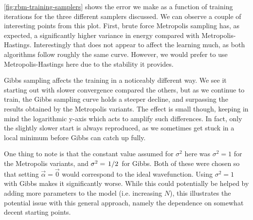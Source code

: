 \documentclass[a4paper, 11pt]{article}
\begin{document}
\begin{multicols}{2}
    
    
    \autoref{fig:rbm-training-samplers} shows the error we make as a function of
    training iterations for the three different samplers discussed. We can
    observe a couple of interesting points from this plot. First, brute force
    Metropolis sampling has, as expected, a significantly higher variance in
    energy compared with Metropolis-Hastings. Interestingly that does not appear
    to affect the learning much, as both algorithms follow roughly the same
    curve. However, we would prefer to use Metropolis-Hastings here due to the
    stability it provides. 

    Gibbs sampling affects the training in a noticeably different way. We see it
    starting out with slower convergence compared the others, but as we continue
    to train, the Gibbs sampling curve holds a steeper decline, and surpassing
    the results obtained by the Metropolis variants. The effect is small though,
    keeping in mind the logarithmic y-axis which acts to amplify such
    differences. In fact, only the slightly slower start is always reproduced,
    as we sometimes get stuck in a local minimum before Gibbs can catch up
    fully.

    One thing to note is that the constant value assumed for $\sigma^2$ here was
    $\sigma^2=1$ for the Metropolis variants, and $\sigma^2=\flatfrac{1}{2}$ for
    Gibbs. Both of these were chosen so that setting $\vec\alpha=\vec 0$ would
    correspond to the ideal wavefunction. Using $\sigma^2=1$ with Gibbs makes it
    significantly worse. While this could potentially be helped by adding more
    parameters to the model (i.e. increasing $N$), this illustrates the
    potential issue with this general approach, namely the dependence on
    somewhat decent starting points.


\end{multicols}
\end{document}
